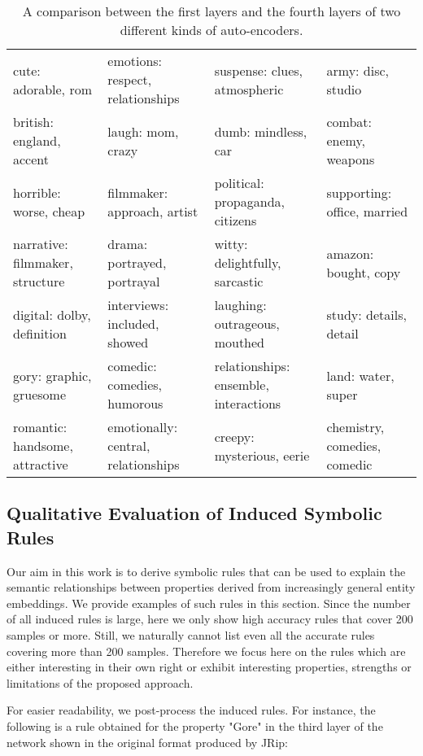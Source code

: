 \begin{sidewaystable}
\begin{tabular}{llll}
			cute: adorable, rom & emotions: respect, relationships & suspense: clues, atmospheric & army: disc, studio\\
			british: england, accent & laugh: mom, crazy & dumb: mindless, car & combat: enemy, weapons  \\
			horrible: worse, cheap & filmmaker: approach, artist & political: propaganda, citizens & supporting: office, married \\
			narrative: filmmaker, structure & drama: portrayed, portrayal & witty: delightfully, sarcastic & amazon: bought, copy \\
			digital: dolby, definition & interviews: included, showed & laughing: outrageous, mouthed & study: details, detail \\
			gory: graphic, gruesome & comedic: comedies, humorous & relationships: ensemble, interactions & land: water, super \\
			romantic: handsome, attractive & emotionally: central, relationships & creepy: mysterious, eerie & chemistry, comedies, comedic \\
		
		\end{tabular}
	\caption{A comparison between the first layers and the fourth layers of two different kinds of auto-encoders.}
	\label{ch5:labelcomparison}

\end{sidewaystable}

\subsection{Qualitative Evaluation of Induced Symbolic Rules}

Our aim in this work is to derive symbolic rules that can be used to explain the semantic relationships between properties derived from increasingly general entity embeddings. We provide examples of such rules in this section. Since the number of all induced rules is large, here we only show high accuracy rules that cover 200 samples or more.  Still, we naturally cannot list even all the accurate rules covering more than 200 samples. Therefore we focus here on the rules which are either interesting in their own right or exhibit interesting properties, strengths or limitations of the proposed approach. 

For easier readability, we post-process the induced rules. For instance, the following is a rule obtained for the property "Gore" in the third layer of the network shown in the original format produced by JRip:

